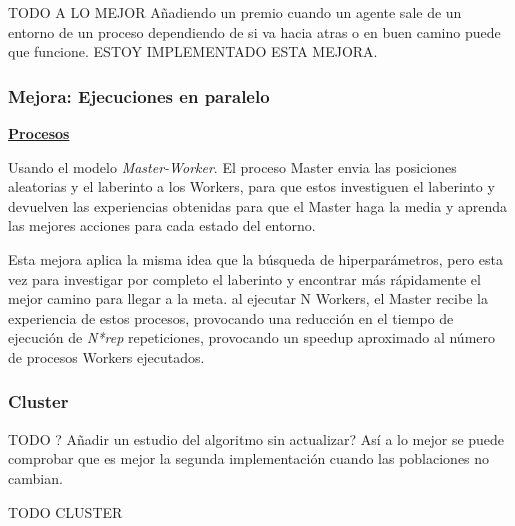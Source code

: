 		\color{blue} %
		TODO A LO MEJOR Añadiendo un premio cuando un agente sale de un entorno de un proceso dependiendo de si va hacia atras o en buen camino puede que funcione. ESTOY IMPLEMENTADO ESTA MEJORA. 
		\color{black}
	
	\subsubsection{Mejora: Ejecuciones en paralelo}
		\begin{flushleft}
		\begin{mdframed}[roundcorner=5pt]		
			\textbf{\underline{Procesos}}
			\vspace{0.1cm}
			
			\scriptsize	
			Usando el modelo \textit{Master-Worker}. El proceso Master envia las posiciones aleatorias y el laberinto a los Workers, para que estos investiguen el laberinto y devuelven las experiencias obtenidas para que el Master haga la media y aprenda las mejores acciones para cada estado del entorno.
		\end{mdframed}
		\end{flushleft}	
		
		Esta mejora aplica la misma idea que la búsqueda de hiperparámetros, pero esta vez para investigar por completo el laberinto y encontrar más rápidamente el mejor camino para llegar a la meta. al ejecutar N Workers, el Master recibe la experiencia de estos procesos, provocando una reducción en el tiempo de ejecución de \textit{N*rep} repeticiones, provocando un speedup aproximado al número de procesos Workers ejecutados.
		
		
		\newpage
		
	\subsubsection{Cluster}
	
		
		
		\vspace{1cm}
		
		\color{blue} TODO ? Añadir un estudio del algoritmo sin actualizar? Así a lo mejor se puede comprobar que es mejor la segunda implementación cuando las poblaciones no cambian.
		
		TODO CLUSTER
		\color{black}
		\newpage


